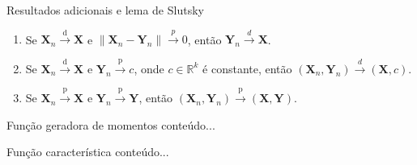 \documentclass[11pt]{beamer}
\begin{document}
	
	\begin{frame}{Resultados adicionais e lema de Slutsky}
		\begin{lemma}
			\begin{enumerate}
				\item Se $\boldsymbol{X}_n \overset{\text{d}}{\to} \boldsymbol{X}$ e $\lVert \boldsymbol{X}_n - \boldsymbol{Y}_n \rVert\overset{p}{\to}0$, então $\boldsymbol{Y}_n \overset{d}{\to} \boldsymbol{X}$.
				\item Se $\boldsymbol{X}_n \overset{\text{d}}{\to} \boldsymbol{X}$ e $\boldsymbol{Y}_n \overset{\text{p}}{\to} c$, onde $c \in \mathbb{R}^k$ é constante, então $(\boldsymbol{X}_n, \boldsymbol{Y}_n) \overset{d}{\to} (\boldsymbol{X}, c)$.
				
				\item Se $\boldsymbol{X}_n \overset{\text{p}}{\to} \boldsymbol{X}$ e $\boldsymbol{Y}_n \overset{\text{p}}{\to} \boldsymbol{Y}$, então $(\boldsymbol{X}_n, \boldsymbol{Y}_n) \overset{\text{p}}{\to} (\boldsymbol{X}, \boldsymbol{Y}) $.
			\end{enumerate}
		\end{lemma}
		\begin{corollary}

		\end{corollary}
	\end{frame}
	
	\begin{frame}{Função geradora de momentos}
		conteúdo...
	\end{frame}
	\begin{frame}{Função característica}
		conteúdo...
	\end{frame}
\end{document}
